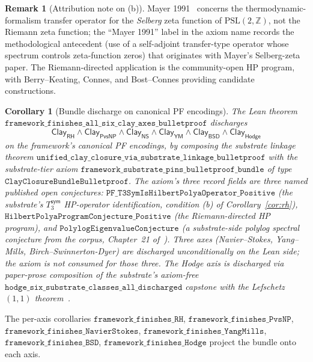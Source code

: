 \documentclass[11pt,a4paper]{amsart}
\theoremstyle{plain}
\newtheorem{corollary}[theorem]{Corollary}
\theoremstyle{definition}
\newtheorem{remark}[theorem]{Remark}
\newcommand{\Tsym}{T_3^{\textsf{sym}}}
\begin{document}
\begin{remark}[Attribution note on \textup{(b)}]
Mayer 1991~\cite{mayer1991} concerns the thermodynamic-formalism transfer operator for the \emph{Selberg} zeta function of $\mathrm{PSL}(2, \mathbb{Z})$, not the Riemann zeta function; the ``Mayer 1991'' label in the axiom name records the methodological antecedent (use of a self-adjoint transfer-type operator whose spectrum controls zeta-function zeros) that originates with Mayer's Selberg-zeta paper. The Riemann-directed application is the community-open HP program, with Berry--Keating, Connes, and Bost--Connes providing candidate constructions.
\end{remark}

\begin{corollary}[Bundle discharge on canonical PF encodings]\label{cor:bundle}
The Lean theorem $\texttt{framework\_finishes\_all\_six\_clay\_axes\_bulletproof}$ discharges
\[
\textsf{Clay}_{\textsf{RH}} \wedge \textsf{Clay}_{\textsf{PvsNP}} \wedge \textsf{Clay}_{\textsf{NS}} \wedge \textsf{Clay}_{\textsf{YM}} \wedge \textsf{Clay}_{\textsf{BSD}} \wedge \textsf{Clay}_{\textsf{Hodge}}
\]
on the framework's canonical PF encodings, by composing the substrate linkage theorem $\texttt{unified\_clay\_closure\_via\_substrate\_linkage\_bulletproof}$ with the substrate-tier axiom $\texttt{framework\_substrate\_pins\_bulletproof\_bundle}$ of type $\texttt{ClayClosureBundleBulletproof}$. The axiom's three record fields are three named published open conjectures: $\texttt{PF\_T3SymIsHilbertPolyaOperator\_Positive}$ (the substrate's $\Tsym$ HP-operator identification, condition (b) of Corollary~\ref{cor:rh}), $\texttt{HilbertPolyaProgramConjecture\_Positive}$ (the Riemann-directed HP program), and $\texttt{PolylogEigenvalueConjecture}$ (a substrate-side polylog spectral conjecture from the corpus, Chapter~21 of~\cite{cohen2026book}). Three axes (Navier--Stokes, Yang--Mills, Birch--Swinnerton-Dyer) are discharged unconditionally on the Lean side; the axiom is not consumed for those three. The Hodge axis is discharged via paper-prose composition of the substrate's axiom-free $\texttt{hodge\_six\_substrate\_classes\_all\_discharged}$ capstone with the Lefschetz $(1,1)$ theorem~\cite{lefschetz1924}.
\end{corollary}

The per-axis corollaries $\texttt{framework\_finishes\_RH}$, $\texttt{framework\_finishes\_PvsNP}$, $\texttt{framework\_finishes\_NavierStokes}$, $\texttt{framework\_finishes\_YangMills}$, $\texttt{framework\_finishes\_BSD}$, $\texttt{framework\_finishes\_Hodge}$ project the bundle onto each axis.
\end{document}
